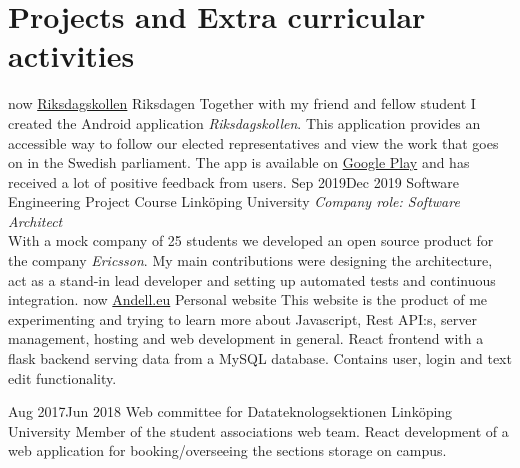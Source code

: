 \documentclass[]{k-cv} %
\begin{document}
\section{Projects and Extra curricular activities}
\begin{entrylist}
\entry
{\to now}
{\href{https://play.google.com/store/apps/details?id=se.oandell.riksdagen&hl=en}{Riksdagskollen}}
{Riksdagen}
{Together with my friend and fellow student I created the Android application \textit{Riksdagskollen}. This application provides an accessible way to follow our elected representatives and view the work that goes on in the Swedish parliament. The app is available on \href{https://play.google.com/store/apps/details?id=se.oandell.riksdagen&hl=en}{Google Play} and has received a lot of positive feedback from users.}
\entry
{Sep 2019\newline\to Dec 2019 }
{Software Engineering Project Course}
{Linköping University}
{\emph{Company role: Software Architect}\\ With a mock company of 25 students we developed an open source product for the company \textit{Ericsson}. My main contributions were designing the architecture, act as a stand-in lead developer and setting up automated tests and continuous integration.}
\entry
{\to now}
{\href{http://Andell.eu/Oscar}{Andell.eu}}
{Personal website}
{This website is the product of me experimenting and trying to learn more about
Javascript, Rest API:s, server management, hosting and web development in general. React frontend with a flask backend serving data from a MySQL database. Contains user, login and text edit functionality.}

\entry
{Aug 2017\newline\to Jun 2018}
{Web committee for Datateknologsektionen}
{Linköping University}
{Member of the student associations web team. React development of a web application for booking/overseeing the sections storage on
campus.}
\end{entrylist}





\clearpage




\end{document}
